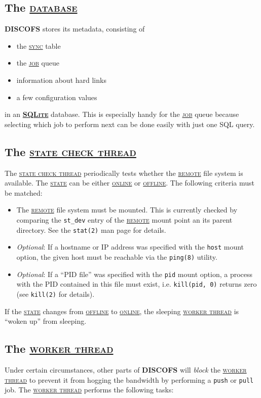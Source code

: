 \documentclass[a4paper]{article}
\newcommand{\software}[1]{\textsc{\textbf{#1}}\xspace}
\newcommand{\discofs}{\software{DISCOFS}}
\newcommand{\sqlite}{\href{http://sqlite.org/}{\software{SQLite}}\xspace}
\newcommand{\keyword}[1]{\hyperref[keyword:#1]{\textsc{#1}}\xspace}
\newcommand{\job}{\keyword{job}}
\newcommand{\jobtype}[1]{\texttt{#1}\xspace}
\newcommand{\push}{\jobtype{push}}
\newcommand{\pull}{\jobtype{pull}}
\newcommand{\sync}{\keyword{sync}}
\newcommand{\remote}{\keyword{remote}}
\newcommand{\database}{\keyword{database}}
\newcommand{\state}{\keyword{state}}
\newcommand{\online}{\keyword{online}}
\newcommand{\offline}{\keyword{offline}}
\newcommand{\workerthread}{\hyperref[keyword:workerthread]{\textsc{worker thread}}\xspace}
\newcommand{\statecheckthread}{\hyperref[keyword:statecheckthread]{\textsc{state check thread}}\xspace}
\begin{document}
\subsection{The \database} %
\label{keyword:database}
\discofs stores its metadata, consisting of
\begin{itemize}
	\item the \sync table
	\item the \job queue
	\item information about hard links
	\item a few configuration values
\end{itemize}
in an \sqlite database. This is especially handy for the \job queue because
selecting which job to perform next can be done easily with just one SQL query.

\subsection{The \statecheckthread} %
\label{keyword:state}
\label{keyword:statecheckthread}
The \statecheckthread periodically tests whether the \remote file system is
available. The \state can be either \online or \offline. The following criteria
must be matched:
\begin{itemize}
	\item The \remote file system must be mounted. This is currently checked by
		comparing the \texttt{st_dev} entry of the \remote mount point an its
		parent directory. See the \texttt{stat(2)} man page for details.

	\item \emph{Optional}: If a hostname or IP address was specified with the
		\texttt{host} mount option, the given host must be reachable via the
		\texttt{ping(8)} utility.

	\item \emph{Optional}: If a ``PID file'' was specified with the \texttt{pid}
		mount option, a process with the PID contained in this file must exist,
		i.e. \texttt{kill(pid,~0)} returns zero (see \texttt{kill(2)} for
		details).
\end{itemize}

If the \state changes from \offline to \online, the sleeping \workerthread is
``woken up'' from sleeping.

\subsection{The \workerthread} %
\label{keyword:workerthread}
Under certain circumstances, other parts of \discofs will \emph{block} the
\workerthread to prevent it from hogging the bandwidth by performing a
\push or \pull job.
The \workerthread performs the following tasks:
\end{document}
